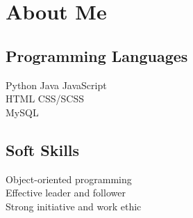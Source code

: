 \documentclass[]{deedy-resume-openfont}
\begin{document}
\section{About Me}
\begin{minipage}[t]{.35\textwidth}
\subsection{Programming Languages}
Python \textbullet{} Java \textbullet{} JavaScript  \\ 
HTML \textbullet{} CSS/SCSS \\
 MySQL
\sectionsep
\end{minipage}
\hfill
\begin{minipage}[t]{.35\textwidth}
\subsection{Soft Skills}
Object-oriented programming \\
Effective leader and follower \\
Strong initiative and work ethic
\end{minipage}
\end{document}
